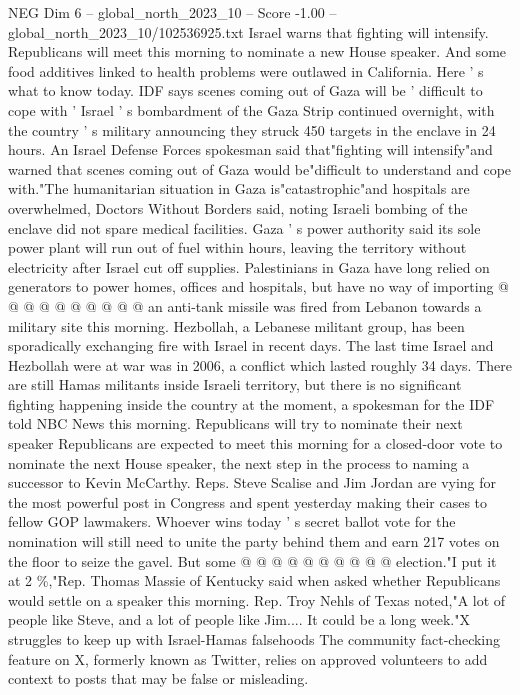 \begin{textsample}{NEG Dim 6 – global\_north\_2023\_10 – Score -1.00 – global\_north\_2023\_10/102536925.txt}  \label{ex:f6_neg_197}
Israel warns that fighting will intensify.
Republicans will meet this morning to nominate a new House speaker.
And some food additives linked to health problems were outlawed in California.
Here ' s what to know today.
IDF says scenes coming out of Gaza will be ' difficult to cope with ' Israel ' s bombardment of the Gaza Strip continued overnight, with the country ' s military announcing they struck 450 targets in the enclave in 24 hours.
An Israel Defense Forces spokesman said that"fighting will intensify"and warned that scenes coming out of Gaza would be"difficult to understand and cope with."The humanitarian situation in Gaza is"catastrophic"and hospitals are overwhelmed, Doctors Without Borders said, noting Israeli bombing of the enclave did not spare medical facilities.
Gaza ' s power authority said its sole power plant will run out of fuel within hours, leaving the territory without electricity after Israel cut off supplies.
Palestinians in Gaza have long relied on generators to power homes, offices and hospitals, but have no way of importing @ @ @ @ @ @ @ @ @ @ an anti-tank missile was fired from Lebanon towards a military site this morning.
Hezbollah, a Lebanese militant group, has been sporadically exchanging fire with Israel in recent days.
The last time Israel and Hezbollah were at war was in 2006, a conflict which lasted roughly 34 days.
There are still Hamas militants inside Israeli territory, but there is no significant fighting happening inside the country at the moment, a spokesman for the IDF told NBC News this morning.
Republicans will try to nominate their next speaker Republicans are expected to meet this morning for a closed-door vote to nominate the next House speaker, the next step in the process to naming a successor to Kevin McCarthy.
Reps.
Steve Scalise and Jim Jordan are vying for the most powerful post in Congress and spent yesterday making their cases to fellow GOP lawmakers.
Whoever wins today ' s secret ballot vote for the nomination will still need to unite the party behind them and earn 217 votes on the floor to seize the gavel.
But some @ @ @ @ @ @ @ @ @ @ election."I put it at 2 \%,"Rep.
Thomas Massie of Kentucky said when asked whether Republicans would settle on a speaker this morning.
Rep.
Troy Nehls of Texas noted,"A lot of people like Steve, and a lot of people like Jim....
It could be a long week."X struggles to keep up with Israel-Hamas falsehoods The community fact-checking feature on X, formerly known as Twitter, relies on approved volunteers to add context to posts that may be false or misleading.

\end{textsample}

